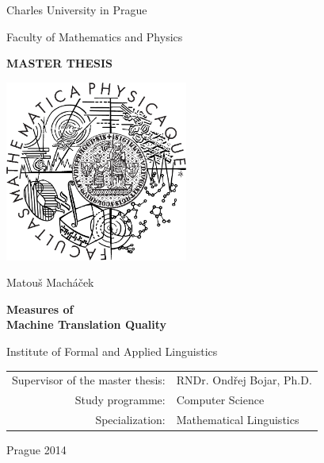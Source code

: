 \documentclass[12pt,a4paper]{report}
\begin{document}


\pagestyle{empty}
\begin{center}

\large

Charles University in Prague

\medskip

Faculty of Mathematics and Physics

\vfill

{\bf\Large MASTER THESIS}

\vfill

\centerline{\mbox{\includegraphics[width=60mm]{img/logo}}}

\vfill
\vspace{5mm}

{\LARGE Matouš Macháček}

\vspace{15mm}

{\LARGE\bfseries Measures of \\ Machine Translation Quality}

\vfill

Institute of Formal and Applied Linguistics

\vfill

\begin{tabular}{rl}

Supervisor of the master thesis: & RNDr. Ondřej Bojar, Ph.D. \\
\noalign{\vspace{2mm}}
Study programme: & Computer Science \\
\noalign{\vspace{2mm}}
Specialization: & Mathematical Linguistics \\
\end{tabular}

\vfill

Prague 2014

\end{center}
\end{document}
